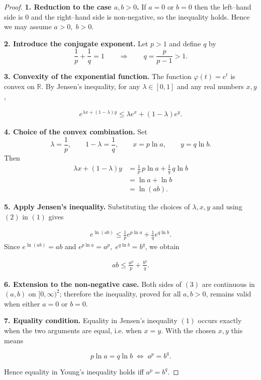 \begin{proof}
\textbf{1. Reduction to the case \(a,b>0\).}  
If \(a=0\) or \(b=0\) then the left–hand side is \(0\) and the right–hand side is
non‑negative, so the inequality holds. Hence we may assume \(a>0,\;b>0\).

\medskip
\textbf{2. Introduce the conjugate exponent.}  
Let \(p>1\) and define \(q\) by  
\[
\frac{1}{p}+\frac{1}{q}=1\qquad\Longrightarrow\qquad 
q=\frac{p}{p-1}>1 .
\]

\medskip
\textbf{3. Convexity of the exponential function.}  
The function \(\varphi(t)=e^{t}\) is convex on \(\mathbb{R}\).  
By Jensen’s inequality, for any \(\lambda\in[0,1]\) and any real numbers \(x,y\),

\begin{align}
e^{\lambda x+(1-\lambda)y}\le \lambda e^{x}+(1-\lambda)e^{y}.
\tag{1}
\end{align}

\medskip
\textbf{4. Choice of the convex combination.}  
Set
\[
\lambda=\frac{1}{p},\qquad 1-\lambda=\frac{1}{q},\qquad
x=p\ln a,\qquad y=q\ln b .
\]
Then
\begin{align}
\lambda x+(1-\lambda)y
&=\frac{1}{p}\,p\ln a+\frac{1}{q}\,q\ln b \\
&=\ln a+\ln b \\
&=\ln(ab).
\tag{2}
\end{align}

\medskip
\textbf{5. Apply Jensen’s inequality.}  
Substituting the choices of \(\lambda,x,y\) and using \((2)\) in \((1)\) gives

\begin{align}
e^{\ln(ab)}\le \frac{1}{p}e^{p\ln a}+\frac{1}{q}e^{q\ln b}.
\end{align}
Since \(e^{\ln(ab)}=ab\) and \(e^{p\ln a}=a^{p},\;e^{q\ln b}=b^{q}\), we obtain

\begin{align}
ab\le \frac{a^{p}}{p}+\frac{b^{q}}{q}.
\tag{3}
\end{align}

\medskip
\textbf{6. Extension to the non‑negative case.}  
Both sides of \((3)\) are continuous in \((a,b)\) on \([0,\infty)^{2}\); therefore the
inequality, proved for all \(a,b>0\), remains valid when either \(a=0\) or \(b=0\).

\medskip
\textbf{7. Equality condition.}  
Equality in Jensen’s inequality \((1)\) occurs exactly when the two arguments are
equal, i.e. when \(x=y\).  With the chosen \(x,y\) this means

\[
p\ln a = q\ln b \;\Longleftrightarrow\; a^{p}=b^{q}.
\]

Hence equality in Young’s inequality holds iff \(a^{p}=b^{q}\).

\end{proof}